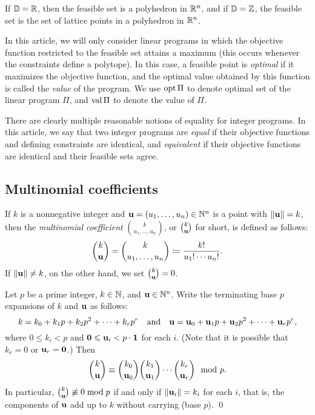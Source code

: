 \documentclass[11pt]{amsart}
\begin{document}
If $\mathbb{D} = \mathbb{R}$, then the feasible set is a polyhedron in $\mathbb{R}^n$, and if $\mathbb{D} = \mathbb{Z}$, the feasible set is the set of lattice points in a polyhedron in $\mathbb{R}^n$.  

In this article, we will only consider linear programs in which the objective function restricted to the feasible set attains a maximum (\eg this occurs whenever the constraints define a polytope).
In this case, a feasible point is \emph{optimal} if it maximizes the objective function, and the optimal value obtained by this function is called the \emph{value} of the program.
We use $\operatorname{opt} \Pi$ to denote optimal set of the linear program $\Pi$, and $\operatorname{val} \Pi$ to denote the value of $\Pi$. 

There are clearly multiple reasonable notions of equality for integer programs.
In this article,  we say that two integer programs are \emph{equal} if their objective functions and defining constraints are identical, and \emph{equivalent} if their objective functions are identical and their feasible sets agree. 

\subsection{Multinomial coefficients}

If $k$ is a nonnegative integer and $\mathbf{u} = (u_1,\ldots,u_n) \in \mathbb{N}^n$ is a point with $\| \mathbf{u} \| = k$, then the \emph{multinomial coefficient} $\binom{k}{u_1,\ldots,u_n}$, or $\binom{k}{\mathbf{u}}$ for short, is defined as follows: 
\[
   \binom{k}{\mathbf{u}} = \binom{k}{u_1,\ldots,u_n} \coloneqq \frac{k!}{u_1!\cdots u_n!}.
\]
If $\| \mathbf{u} \| \ne k$, on the other hand, we set $\binom{k}{\mathbf{u}}=0$.
	
\begin{theorem}
   \label{thm: dickson}
   Let $p$ be a prime integer, $k\in \mathbb{N}$, and $\mathbf{u} \in \mathbb{N}^n$.
   Write the terminating base $p$ expansions of $k$ and $\mathbf{u}$ as follows\textup:
   \begin{equation*}
      k = k_0+k_1p+k_2p^2+\cdots+k_rp^r\quad \text{and} \quad \mathbf{u}=\mathbf{u}_0+\mathbf{u}_1p+\mathbf{u}_2p^2+\cdots+\mathbf{u}_rp^r,
   \end{equation*}
   where $0\le k_i < p$ and $\mathbf{0}\leqslant\mathbf{u}_i < p \cdot \mathbf{1}$ for each $i$.
   \textup{(}Note that it is possible that $k_r = 0$ or $\mathbf{u}_r = \mathbf{0}$.\textup{)}
   Then
   \[
      \binom{k}{\mathbf{u}}\equiv \binom{k_0}{\mathbf{u}_0}\binom{k_1}{\mathbf{u}_1}\cdots \binom{k_r}{\mathbf{u}_r} \mod{p}.
   \]
   In particular, $\binom{k}{\mathbf{u}}\not\equiv 0\bmod{p}$ if and only if $\| \mathbf{u}_i \|=k_i$ for each $i$, that is, the components of $\mathbf{u}$ add up to $k$ without carrying \textup(base $p$\textup).
\qed
\end{theorem}
\end{document}
